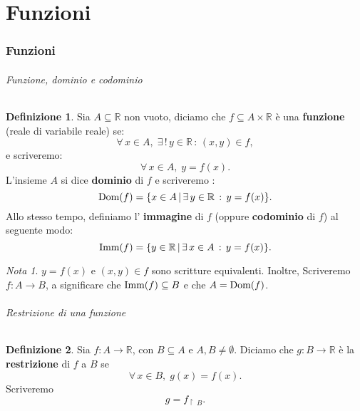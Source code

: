 \documentclass{article}
\theoremstyle{plain}
\theoremstyle{definition}
\newtheorem{defn}{Definizione}[section]
\theoremstyle{remark}
\newtheorem{note}{Nota}
\begin{document}
\vspace{50pt}

\part{Funzioni}

\vspace{50pt} 

\section{Funzioni}

\vspace{50pt}

\paragraph{Funzione, dominio e codominio}
\begin{bxthm}
\begin{defn}
    Sia $A\subseteq\mathbb{R}$ non vuoto, diciamo che 
    $f\subseteq A\times\mathbb{R}$ è una \textbf{funzione} (reale di variabile reale) se:
    \[\forall\, x\in A,\;\exists\,!\,y\in\mathbb{R}\,:\,(x,y)\in f,\]
    e scriveremo: \[\forall\, x\in A,\;y=f(x).\]
    L'insieme $A$ si dice \textbf{dominio} di $f$ e scriveremo :
    \[\textup{Dom}(f)=\{x\in A \,|\, \exists\, y\in\mathbb{R}\, :\, y=f(x)\}.\]
    Allo stesso tempo, definiamo l' \textbf{immagine} di $f$ (oppure \textbf{codominio} di $f$) al seguente modo: 
    \[\textup{Imm}(f)=\{y\in\mathbb{R}\,|\,\exists\, x\in A\, :\, y=f(x)\}.\]
\end{defn}
\end{bxthm}

\vspace{10pt}

\begin{note}
    $y=f(x)$ e $(x,y)\in f$ sono scritture equivalenti. Inoltre, Scriveremo $f:A\to B$, a significare che $\textup{Imm}(f)\subseteq B$ e che $A=\textup{Dom}(f)$.
\end{note}

\vspace{10pt}

\paragraph{Restrizione di una funzione}
\begin{bxthm}
\begin{defn}
    Sia $f:A\to\mathbb{R}$, con $B\subseteq A$ e $A,B\neq\emptyset$.
    Diciamo che $g:B\to\mathbb{R}$ è la \textbf{restrizione} di $f$ a $B$ se 
    \[\forall\, x\in B,\; g(x)=f(x).\]
    Scriveremo \[g=f_{\upharpoonright \ B}.\]
\end{defn}
\end{bxthm}
\end{document}
